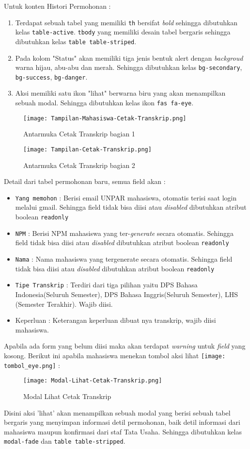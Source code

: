 Untuk konten Histori Permohonan :
\begin{enumerate}
	\item Terdapat sebuah tabel yang memiliki \verb|th| bersifat \textit{bold} sehingga dibutuhkan kelas \verb|table-active|. \verb|tbody| yang memiliki desain tabel bergaris sehingga dibutuhkan kelas \verb|table table-striped|.
	\item Pada kolom "Status" akan memiliki tiga jenis bentuk alert dengan \textit{backgroud} warna hijau, abu-abu dan merah. Sehingga dibutuhkan kelas \verb|bg-secondary|, \verb|bg-success|, \verb|bg-danger|.
	\item Aksi memiliki satu ikon "lihat" berwarna biru yang akan menampilkan sebuah modal. Sehingga dibutuhkan kelas ikon \verb|fas fa-eye|.
\end{enumerate}
\begin{figure} [H]
	\centering  
	\texttt{[image: Tampilan-Mahasiswa-Cetak-Transkrip.png]}  
	\caption{Antarmuka Cetak Transkrip bagian 1} 
\end{figure}
\begin{figure} [H]
	\centering  
	\texttt{[image: Tampilan-Cetak-Transkrip.png]}  
	\caption{Antarmuka Cetak Transkrip bagian 2} 
\end{figure}
Detail dari tabel permohonan baru, semua field akan  :
\begin{itemize}
	\item \texttt{Yang memohon} : Berisi email UNPAR mahasiswa, otomatis terisi saat login melalui gmail. Sehingga field tidak bisa diisi atau \textit{disabled} dibutuhkan atribut boolean \verb|readonly|
	\item \texttt{NPM} : Berisi NPM mahasiswa yang ter-\textit{generate} secara otomatis. Sehingga field tidak bisa diisi atau \textit{disabled} dibutuhkan atribut boolean \verb|readonly|
	\item \texttt{Nama} : Nama mahasiswa yang tergenerate secara otomatis. Sehingga field tidak bisa diisi atau \textit{disabled} dibutuhkan atribut boolean \verb|readonly|
	\item \texttt{Tipe Transkrip} : Terdiri dari tiga pilihan yaitu DPS Bahasa Indonesia(Seluruh Semester), DPS Bahasa Inggris(Seluruh Semester), LHS (Semester Terakhir). Wajib diisi.
	\item Keperluan : Keterangan keperluan dibuat nya transkrip, wajib diisi mahasiswa.
\end{itemize}
Apabila ada form yang belum diisi maka akan terdapat \textit{warning} untuk \textit{field} yang kosong.
Berikut ini apabila mahasiswa menekan tombol aksi lihat \texttt{[image: tombol\_eye.png]} :
\begin{figure} [H]
	\centering  
	\texttt{[image: Modal-Lihat-Cetak-Transkrip.png]}  
	\caption{Modal Lihat Cetak Transkrip} 
\end{figure}
\noindent Disini aksi 'lihat' akan menampilkan sebuah modal yang berisi sebuah tabel bergaris yang menyimpan informasi detil permohonan, baik detil informasi dari mahasiswa maupun konfirmasi dari staf Tata Usaha. Sehingga dibutuhkan kelas \verb|modal-fade| dan \verb|table table-stripped|.

